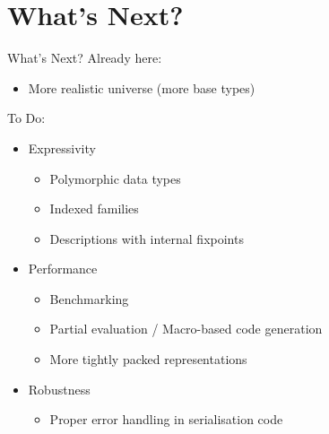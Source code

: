 
\section{What's Next?}

\begin{frame}{What's Next?}
Already here:
\begin{itemize}
  \item More realistic universe (more base types)
\end{itemize}
\bigskip
To Do:
\begin{itemize}
  \item Expressivity
  \begin{itemize}
    \item Polymorphic data types
    \item Indexed families
    \item Descriptions with internal fixpoints
  \end{itemize}

  \item Performance
  \begin{itemize}
    \item Benchmarking
    \item Partial evaluation / Macro-based code generation
    \item More tightly packed representations
  \end{itemize}

  \item Robustness
  \begin{itemize}
    \item Proper error handling in serialisation code
  \end{itemize}
\end{itemize}
\end{frame}
